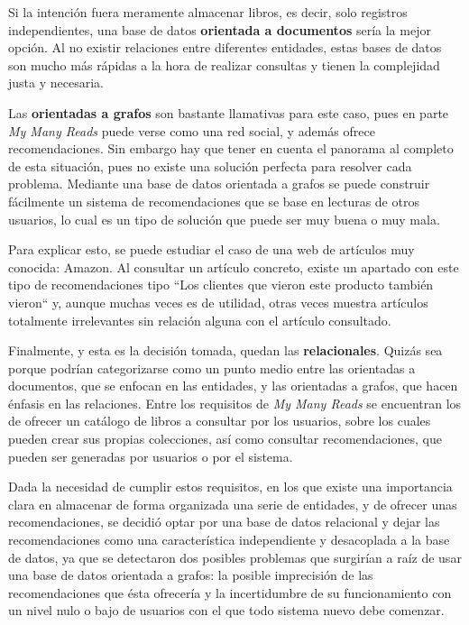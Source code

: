 Si la intención fuera meramente almacenar libros, es decir, solo registros independientes, una base de datos \textbf{orientada a documentos} sería la mejor opción. Al no existir relaciones entre diferentes entidades, estas bases de datos son mucho más rápidas a la hora de realizar consultas y tienen la complejidad justa y necesaria.

Las \textbf{orientadas a grafos} son bastante llamativas para este caso, pues en parte \textit{My Many Reads} puede verse como una red social, y además ofrece recomendaciones. Sin embargo hay que tener en cuenta el panorama al completo de esta situación, pues no existe una solución perfecta para resolver cada problema. Mediante una base de datos orientada a grafos se puede construir fácilmente un sistema de recomendaciones que se base en lecturas de otros usuarios, lo cual es un tipo de solución que puede ser muy buena o muy mala.

Para explicar esto, se puede estudiar el caso de una web de artículos muy conocida: Amazon. Al consultar un artículo concreto, existe un apartado con este tipo de recomendaciones tipo ``Los clientes que vieron este producto también vieron`` y, aunque muchas veces es de utilidad, otras veces muestra artículos totalmente irrelevantes sin relación alguna con el artículo consultado.

Finalmente, y esta es la decisión tomada, quedan las \textbf{relacionales}. Quizás sea porque podrían categorizarse como un punto medio entre las orientadas a documentos, que se enfocan en las entidades, y las orientadas a grafos, que hacen énfasis en las relaciones. Entre los requisitos de \textit{My Many Reads} se encuentran los de ofrecer un catálogo de libros a consultar por los usuarios, sobre los cuales pueden crear sus propias colecciones, así como consultar recomendaciones, que pueden ser generadas por usuarios o por el sistema.

Dada la necesidad de cumplir estos requisitos, en los que existe una importancia clara en almacenar de forma organizada una serie de entidades, y de ofrecer unas recomendaciones, se decidió optar por una base de datos relacional y dejar las recomendaciones como una característica independiente y desacoplada a la base de datos, ya que se detectaron dos posibles problemas que surgirían a raíz de usar una base de datos orientada a grafos: la posible imprecisión de las recomendaciones que ésta ofrecería y la incertidumbre de su funcionamiento con un nivel nulo o bajo de usuarios con el que todo sistema nuevo debe comenzar.

